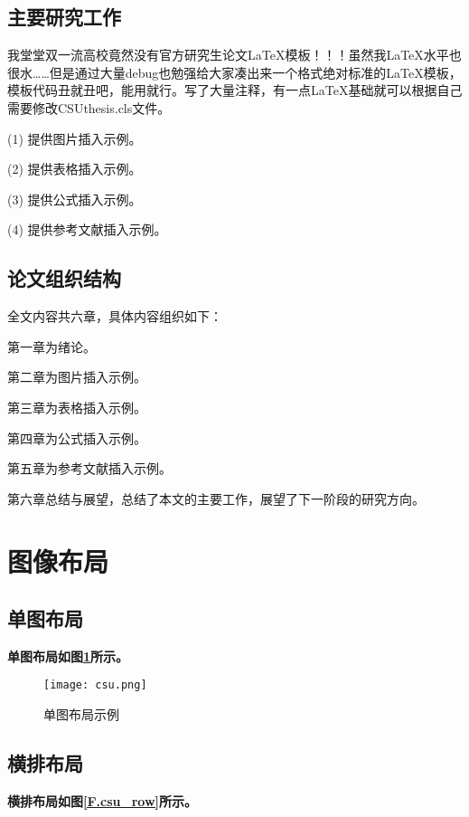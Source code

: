 \subsection{主要研究工作}
我堂堂双一流高校竟然没有官方研究生论文LaTeX模板！！！虽然我LaTeX水平也很水……但是通过大量debug也勉强给大家凑出来一个格式绝对标准的LaTeX模板，模板代码丑就丑吧，能用就行。写了大量注释，有一点LaTeX基础就可以根据自己需要修改CSUthesis.cls文件。

(1) 提供图片插入示例。

(2) 提供表格插入示例。

(3) 提供公式插入示例。

(4) 提供参考文献插入示例。

\subsection{论文组织结构}

全文内容共六章，具体内容组织如下：

第一章为绪论。

第二章为图片插入示例。

第三章为表格插入示例。

第四章为公式插入示例。

第五章为参考文献插入示例。

第六章总结与展望，总结了本文的主要工作，展望了下一阶段的研究方向。

\newpage

\section{图像布局}


\subsection{单图布局}



\textbf{单图布局如图\ref{F.csu_single}所示。}

\begin{figure}[hbt]
\centering
\texttt{[image: csu.png]}
\caption{单图布局示例}
\label{F.csu_single}
\end{figure}

\subsection{横排布局}

\textbf{横排布局如图\ref{F.csu_row}所示。}

